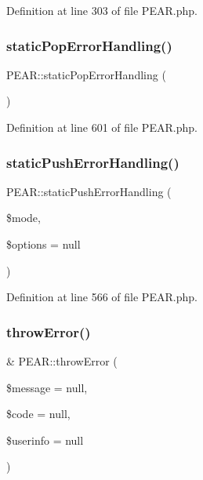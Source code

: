 Definition at line 303 of file P\+E\+A\+R.\+php.

\hypertarget{classPEAR_ad558eaf2cadc1eb2afa180f7a75bcab3}{}\label{classPEAR_ad558eaf2cadc1eb2afa180f7a75bcab3} 
\subsubsection{\texorpdfstring{static\+Pop\+Error\+Handling()}{staticPopErrorHandling()}}
{\footnotesize\ttfamily P\+E\+A\+R\+::static\+Pop\+Error\+Handling (\begin{DoxyParamCaption}{ }\end{DoxyParamCaption})}



Definition at line 601 of file P\+E\+A\+R.\+php.

\hypertarget{classPEAR_a5bfc268ba255bb88c2f98bb5f9f0a124}{}\label{classPEAR_a5bfc268ba255bb88c2f98bb5f9f0a124} 
\subsubsection{\texorpdfstring{static\+Push\+Error\+Handling()}{staticPushErrorHandling()}}
{\footnotesize\ttfamily P\+E\+A\+R\+::static\+Push\+Error\+Handling (\begin{DoxyParamCaption}\item[{}]{\$mode,  }\item[{}]{\$options = {\ttfamily null} }\end{DoxyParamCaption})}



Definition at line 566 of file P\+E\+A\+R.\+php.

\hypertarget{classPEAR_a146f08ee812450913835040d43b2c832}{}\label{classPEAR_a146f08ee812450913835040d43b2c832} 
\subsubsection{\texorpdfstring{throw\+Error()}{throwError()}}
{\footnotesize\ttfamily \& P\+E\+A\+R\+::throw\+Error (\begin{DoxyParamCaption}\item[{}]{\$message = {\ttfamily null},  }\item[{}]{\$code = {\ttfamily null},  }\item[{}]{\$userinfo = {\ttfamily null} }\end{DoxyParamCaption})}

